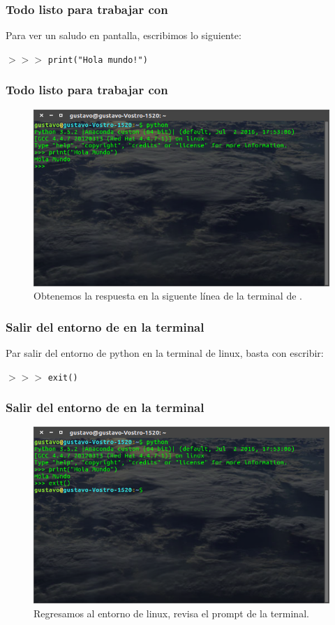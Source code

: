 \documentclass[12pt]{beamer}
\begin{document}
\begin{frame}
\frametitle{Todo listo para trabajar con \python}
Para ver un saludo en pantalla, escribimos lo siguiente:
\begin{center}
$>>>$ \texttt{print("Hola mundo!")} \keys{\return}
\end{center}
\end{frame}
\begin{frame}
\frametitle{Todo listo para trabajar con \python}
\begin{figure}
	\centering
	\includegraphics[scale=0.25]{Figuras/Terminal_03.png}
	\caption{Obtenemos la respuesta en la siguente línea de la terminal de \python.}
\end{figure}
\end{frame}
\begin{frame}
\frametitle{Salir del entorno de \python{} en la terminal}
Par salir del entorno de python en la terminal de linux, basta con escribir:
\begin{center}
$>>>$ \texttt{exit()} \keys{\return}
\end{center}
\end{frame}
\begin{frame}
\frametitle{Salir del entorno de \python{} en la terminal}
\begin{figure}
	\centering
	\includegraphics[scale=0.25]{Figuras/Terminal_04.png}
	\caption{Regresamos al entorno de linux, revisa el prompt de la terminal.}
\end{figure}
\end{frame}
\end{document}
